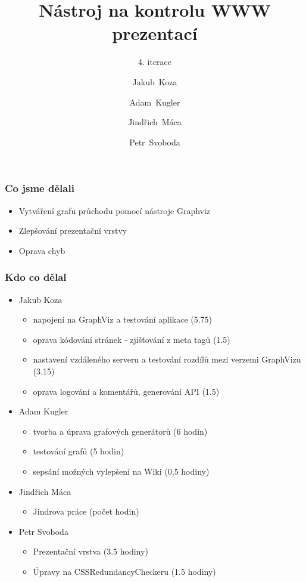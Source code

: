 \documentclass{beamer}
\begin{document}
\title [NKWP]{Nástroj na kontrolu WWW prezentací}
\author[J.~ Koza, A.~ Kugler, J.~Máca, P.~Svoboda]{Jakub~Koza \and Adam~Kugler \and Jindřich~Máca \and Petr~Svoboda}

\subtitle{4. iterace}
\frame{\titlepage}
\begin{frame}[allowframebreaks]\frametitle{Co jsme dělali}
   \begin{itemize}
    \item Vytváření grafu průchodu pomocí nástroje Graphviz
	\item Zlepšování prezentační vrstvy
	\item Oprava chyb
   \end{itemize}
\end{frame}

\begin{frame}[allowframebreaks]\frametitle{Kdo co dělal} 
  \begin{itemize}
    \item Jakub Koza
      \begin{itemize}
       \item napojení na GraphViz a testování aplikace (5.75)
       \item oprava kódování stránek - zjišťování z meta tagů (1.5)
       \item nastavení vzdáleného serveru a testování rozdílů mezi verzemi GraphVizu (3.15)
       \item oprava logování a komentářů, generování API (1.5)
     \end{itemize}

    \item Adam Kugler
      \begin{itemize}
       \item tvorba a úprava grafových generátorů (6 hodin)
       \item testování grafů (5 hodin)
       \item sepsání možných vylepšení na Wiki (0,5 hodiny)
     \end{itemize}

    \item Jindřich Máca
      \begin{itemize}
       \item Jindrova práce (počet hodin)
     \end{itemize}

    \item Petr Svoboda
      \begin{itemize}
       \item Prezentační vrstva (3.5 hodiny)
       \item Úpravy na CSSRedundancyCheckeru (1.5 hodiny)
     \end{itemize}
   \end{itemize}  
\end{frame} 
\end{document}

